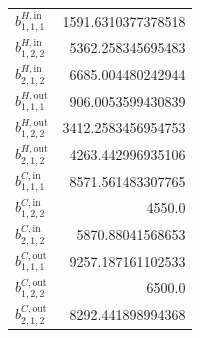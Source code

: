 \documentclass{article}%
\begin{document}
\begin{multicols*}{3}
\begin{supertabular}{lr}
	$b_{1,1,1}^{H,\text{in}}$ & 1591.6310377378518 \\%
	$b_{1,2,2}^{H,\text{in}}$ & 5362.258345695483 \\%
	$b_{2,1,2}^{H,\text{in}}$ & 6685.004480242944 \\%
	$b_{1,1,1}^{H,\text{out}}$ & 906.0053599430839 \\%
	$b_{1,2,2}^{H,\text{out}}$ & 3412.2583456954753 \\%
	$b_{2,1,2}^{H,\text{out}}$ & 4263.442996935106 \\%
	$b_{1,1,1}^{C,\text{in}}$ & 8571.561483307765 \\%
	$b_{1,2,2}^{C,\text{in}}$ & 4550.0 \\%
	$b_{2,1,2}^{C,\text{in}}$ & 5870.88041568653 \\%
	$b_{1,1,1}^{C,\text{out}}$ & 9257.187161102533 \\%
	$b_{1,2,2}^{C,\text{out}}$ & 6500.0 \\%
	$b_{2,1,2}^{C,\text{out}}$ & 8292.441898994368 \\%
\end{supertabular}%
\end{multicols*}%
\clearpage%
\end{document}
